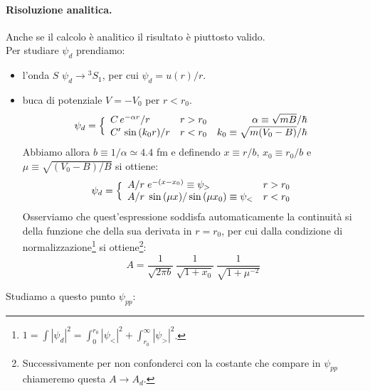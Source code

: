 \paragraph{Risoluzione analitica.} Anche se il calcolo è analitico il risultato è piuttosto valido.\\
Per studiare $\psi_d$ prendiamo:
\begin{itemize}
    \item l'onda $S$ $\psi_d\to{^3S_1}$, per cui $\psi_d = u(r)/r$.
    \item buca di potenziale $V = -V_0$ per $r<r_0$.
    $$%
    \psi_d = \Bigl \{
    \begin{array}{llr}
        C\, e^{-\alpha r }/r & r>r_0 & \alpha\equiv \sqrt{mB}/\hbar \\
        C'\, \sin{(k_0 r)}/r & r<r_0 & k_0 \equiv \sqrt{m(V_0-B)}/\hbar
    \end{array}%
    $$
    Abbiamo allora $b\equiv 1/\alpha \simeq 4.4$ fm e definendo $x\equiv r/b$, $x_0\equiv r_0/b$ e $\mu \equiv \sqrt{(V_0-B)/B}$ si ottiene:
    $$%
    \psi_d = \Bigl \{
    \begin{array}{ll}
        A/r\; e^{-(x-x_0)}\equiv \psi_> & r>r_0 \\
        A/r\; \sin{(\mu x)}/\sin{(\mu x_0)}\equiv \psi_< & r<r_0
    \end{array}%
    $$
    Osserviamo che quest'espressione soddisfa automaticamente la continuità si della funzione che della sua derivata in $r=r_0$, per cui dalla condizione di normalizzazione\footnote{$1=\int |\psi_d|^2=\int_0^{r_0}|\psi_<|^2+\int_{r_0}^\infty|\psi_>|^2$.} si ottiene\footnote{Successivamente per non confonderci con la costante che compare in $\psi_{pp}$ chiameremo questa $A\to A_d$.}:
    $$A = \frac{1}{\sqrt{2\pi b}}\, \frac{1}{\sqrt{1+x_0}}\,\frac{1}{\sqrt{1+\mu^{-2}}}$$
\end{itemize}
Studiamo a questo punto $\psi_{pp}$:
